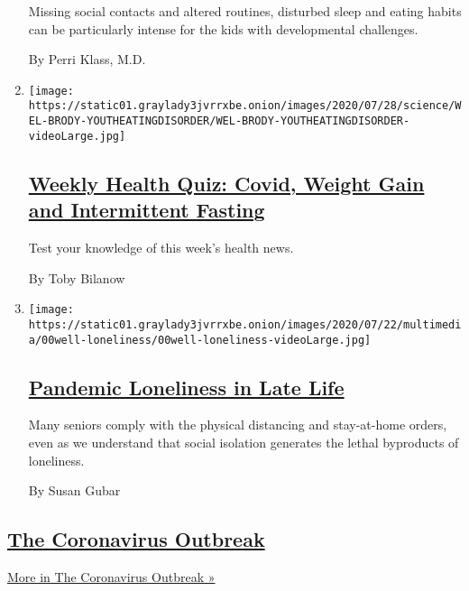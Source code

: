 \begin{enumerate}
  Missing social contacts and altered routines, disturbed sleep and
  eating habits can be particularly intense for the kids with
  developmental challenges.

  By Perri Klass, M.D.
\item
  \texttt{[image: https://static01.graylady3jvrrxbe.onion/images/2020/07/28/science/WEL-BRODY-YOUTHEATINGDISORDER/WEL-BRODY-YOUTHEATINGDISORDER-videoLarge.jpg]}

  \hypertarget{weekly-health-quiz-covid-weight-gain-and-intermittent-fasting}{%
  \subsection{\texorpdfstring{\href{/interactive/2020/07/31/well/live/31healthquiz-07312020.html}{Weekly
  Health Quiz: Covid, Weight Gain and Intermittent
  Fasting}}{Weekly Health Quiz: Covid, Weight Gain and Intermittent Fasting}}\label{weekly-health-quiz-covid-weight-gain-and-intermittent-fasting}}

  Test your knowledge of this week's health news.

  By Toby Bilanow
\item
  \texttt{[image: https://static01.graylady3jvrrxbe.onion/images/2020/07/22/multimedia/00well-loneliness/00well-loneliness-videoLarge.jpg]}

  \hypertarget{pandemic-loneliness-in-late-life}{%
  \subsection{\texorpdfstring{\href{/2020/07/30/well/mind/pandemic-loneliness-in-late-life.html}{Pandemic
  Loneliness in Late
  Life}}{Pandemic Loneliness in Late Life}}\label{pandemic-loneliness-in-late-life}}

  Many seniors comply with the physical distancing and stay-at-home
  orders, even as we understand that social isolation generates the
  lethal byproducts of loneliness.

  By Susan Gubar
\end{enumerate}

\hypertarget{the-coronavirus-outbreak}{%
\subsection{\texorpdfstring{\href{/news-event/coronavirus}{The
Coronavirus
Outbreak}}{The Coronavirus Outbreak}}\label{the-coronavirus-outbreak}}

\href{/news-event/coronavirus}{More in The Coronavirus Outbreak »}

